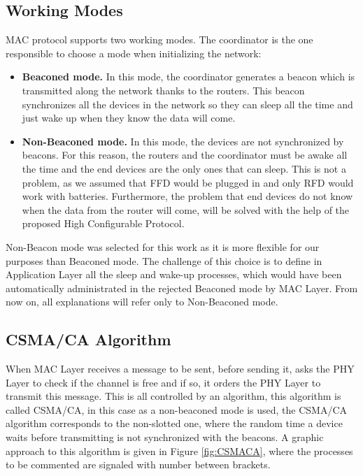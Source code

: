 \subsection{Working Modes}

\ac{MAC} protocol supports two working modes. The coordinator is the one responsible to choose a mode when initializing the network:

\begin{itemize}
 \item \textbf{Beaconed mode.} In this mode, the coordinator generates a beacon which is transmitted along the network thanks to the routers.
This beacon synchronizes all the devices in the network so they can sleep all the time and just wake up when they know the data will come. 
 \item \textbf{Non-Beaconed mode.} In this mode, the devices are not synchronized by beacons. For this reason, the routers and the coordinator must
be awake all the time and the end devices are the only ones that can sleep. This is not a problem, as we assumed that \ac{FFD} would be plugged 
in and only \ac{RFD} would work with batteries. Furthermore, the problem that end devices do not know when the data from the router will come, 
will be solved with the help of the proposed High Configurable Protocol.
\end{itemize}

Non-Beacon mode was selected for this work as it is more flexible for our purposes than Beaconed mode. The challenge of this choice is to 
define in Application Layer all the sleep and wake-up processes, which would have been automatically administrated in the rejected Beaconed
mode by \ac{MAC} Layer. From now on, all explanations will refer only to Non-Beaconed mode.

\subsection{\ac{CSMA/CA} Algorithm}

When \ac{MAC} Layer receives a message to be sent, before sending it, asks the \ac{PHY} Layer to check if the channel is free and if so, it 
orders the \ac{PHY} Layer to transmit this message. This is all controlled by an algorithm, this algorithm is called \ac{CSMA/CA}, in this 
case as a non-beaconed mode is used, the \ac{CSMA/CA} algorithm corresponds to the non-slotted one, where the random time a device waits 
before transmitting is not synchronized with the beacons. A graphic approach to this algorithm is given in Figure \ref{fig:CSMACA}, where the
processes to be commented are signaled with number between brackets.

